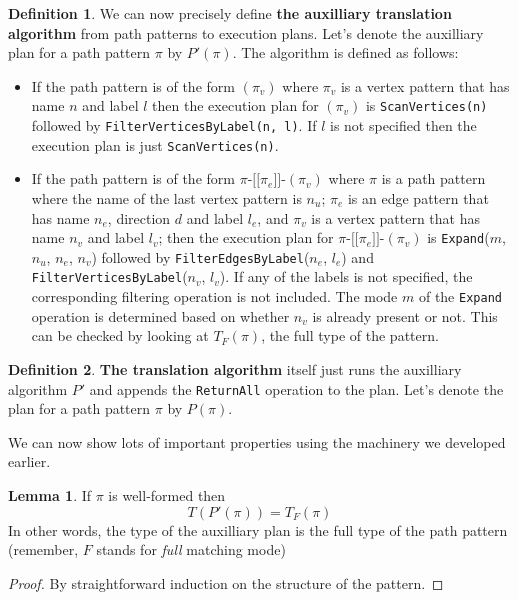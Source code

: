 \documentclass[14pt]{constructor-thesis}
\theoremstyle{definition}
\newtheorem{lemma}{Lemma}
\newtheorem{definition}{Definition}
\newcommand{\patternstart}[1]{(#1)}
\newcommand{\patternhop}[3]{#1 \texttt{-[[} #2 \texttt{]]-} (#3)}
\begin{document}
\begin{definition}
  We can now precisely define \textbf{the auxilliary translation algorithm} from path patterns to execution plans. Let's denote the auxilliary plan for a path pattern $\pi$ by $P'(\pi)$. The algorithm is defined as follows:
  \begin{itemize}
    \item If the path pattern is of the form $\patternstart{\pi_v}$ where $\pi_v$ is a vertex pattern that has name $n$ and label $l$ then the execution plan for $(\pi_v)$ is \texttt{ScanVertices(n)} followed by \texttt{FilterVerticesByLabel(n, l)}. If $l$ is not specified then the execution plan is just \texttt{ScanVertices(n)}.

    \item If the path pattern is of the form $\patternhop{\pi}{\pi_e}{\pi_v}$ where $\pi$ is a path pattern where the name of the last vertex pattern is $n_u$; $\pi_e$ is an edge pattern that has name $n_e$, direction $d$ and label $l_e$, and $\pi_v$ is a vertex pattern that has name $n_v$ and label $l_v$; then the execution plan for $\patternhop{\pi}{\pi_e}{\pi_v}$ is \texttt{Expand}($m$, $n_u$, $n_e$, $n_v$) followed by \texttt{FilterEdgesByLabel}($n_e$, $l_e$) and \texttt{FilterVerticesByLabel}($n_v$, $l_v$). 
    If any of the labels is not specified, the corresponding filtering operation is not included. The mode $m$ of the \texttt{Expand} operation is determined based on whether $n_v$ is already present or not. This can be checked by looking at $T_F(\pi)$, the full type of the pattern.
  \end{itemize} 
\end{definition}

\begin{definition}
  \textbf{The translation algorithm} itself just runs the auxilliary algorithm $P'$ and appends the \texttt{ReturnAll} operation to the plan.
  Let's denote the plan for a path pattern $\pi$ by $P(\pi)$.
\end{definition}

We can now show lots of important properties using the machinery we developed earlier.

\begin{lemma}
  \label{lem:neo4j-translation-type}
  If $\pi$ is well-formed then
  $$T(P'(\pi)) = T_F(\pi)$$
  In other words, the type of the auxilliary plan is the full type of the path pattern (remember, $F$ stands for \textit{full} matching mode)
\end{lemma}
\begin{proof}
  By straightforward induction on the structure of the pattern.
\end{proof}
\end{document}
